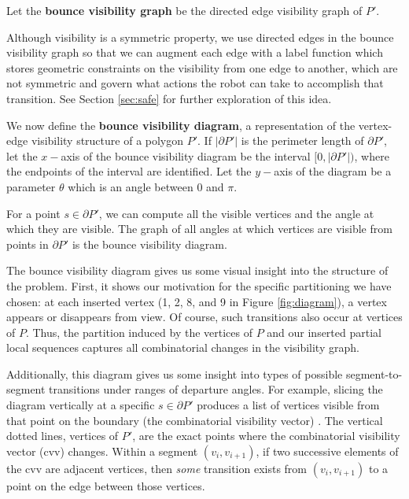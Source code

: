 \documentclass[]{styles/svproc}  %
\begin{document}
\begin{definition}
Let the \textbf{bounce visibility graph} be the directed edge visibility graph of
$P'$.
\end{definition}

Although visibility is a symmetric property, we use directed edges in the
bounce visibility graph so that 
we can augment each edge with a label function which stores
geometric constraints on the visibility from one edge to another, which are
not symmetric and govern what actions the robot can take to accomplish that
transition. See Section \ref{sec:safe} for further exploration of this idea.

We now define the \textbf{bounce visibility diagram}, a
representation of the vertex-edge visibility structure of a polygon $P'$.
If $|\partial P'|$ is the perimeter length of $\partial P'$, let the $x-$axis of the
bounce visibility diagram be the interval $[0, |\partial P'|)$, where the
endpoints of the interval are identified. Let the $y-$axis of the diagram be a
parameter $\theta$ which is an angle between $0$ and $\pi$.

For a point $s \in \partial P'$, we can compute all the visible vertices and
the angle at which they are visible. The graph of all angles at which vertices
are visible from points in $\partial P'$ is the bounce visibility diagram.

The bounce visibility diagram gives us some visual insight into the structure of
the problem. First, it shows our motivation for the specific partitioning we
have chosen: at each inserted vertex (1, 2, 8, and 9 in Figure
\ref{fig:diagram}), a vertex appears or disappears from view. Of course, such
transitions also occur at vertices of $P$. Thus, the partition induced by the
vertices of $P$ and our inserted partial local sequences captures all
combinatorial changes in the visibility graph.

Additionally, this diagram gives us some insight into types of possible
segment-to-segment transitions under ranges of departure angles. 
For example, slicing the diagram vertically at a specific $s \in \partial P'$
produces a list of vertices visible from that point on the boundary (the
combinatorial visibility vector) \cite{suri2008simple}. The vertical dotted
lines, vertices of $P'$, are the exact points where the combinatorial visibility
vector (cvv) changes. Within a segment $(v_i, v_{i+1})$, if two successive elements of the cvv are 
adjacent vertices, then \emph{some} transition exists from
$(v_i, v_{i+1})$ to a point on the edge between those vertices.
\end{document}
